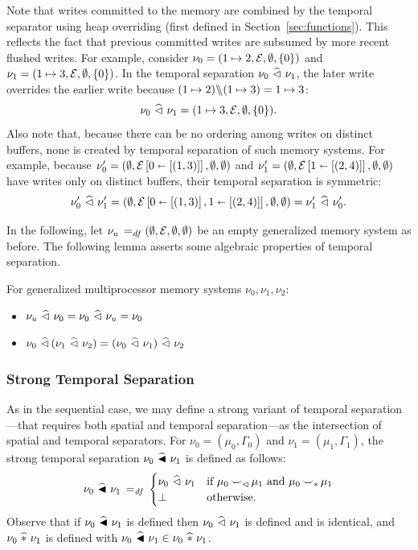 \documentclass[11pt]{report}         %
\begin{document}
Note that writes committed to the memory are combined by the temporal separator using heap overriding (first defined in Section~\ref{sec:functions}). This reflects the fact that previous committed writes are subsumed by more recent flushed writes. For example, consider $\nu_0 = (1 \mapsto 2,\arnil,\nil,\set{0})$ and $\nu_1 = (1 \mapsto 3, \arnil, \nil, \set{0})$. In the temporal separation $\nu_0 \mseq \nu_1$, the later write overrides the earlier write because $(1 \mapsto 2) \override (1\mapsto 3) = 1 \mapsto 3$: \[ \nu_0 \mseq \nu_1 = (1 \mapsto 3, \arnil, \nil, \set{0}).\] Also note that, because there can be no ordering among writes on distinct buffers, none is created by temporal separation of such memory systems. For example, because $\nu'_0 = (\nil,\funup{\arnil}{\ptup{0}{\llit{(1,3)}}},\nil,\nil)$ and $\nu'_1 = (\nil,\funup{\arnil}{\ptup{1}{\llit{(2,4)}}},\nil,\nil)$ have writes only on distinct buffers, their temporal separation is symmetric: \[ \nu'_0 \mseq \nu'_1 = (\nil,\funup{\arnil}{\ptup{0}{\llit{(1,3)}},\ptup{1}{\llit{(2,4)}}},\nil,\nil) = \nu'_1 \mseq \nu'_0.\]

In the following, let $\nu_u \eqdef (\nil, \arnil, \nil, \nil)$ be an empty generalized memory system as before. The following lemma asserts some algebraic properties of temporal separation. \begin{proposition}
  \label{lem:temporal-separation-algebra}
  For generalized multiprocessor memory systems $\nu_0, \nu_1, \nu_2$: 
  \begin{itemize}
    \item $\nu_u \mseq \nu_0 = \nu_0 \mseq \nu_u = \nu_0$
    \item $\nu_0 \mseq (\nu_1 \mseq \nu_2) = (\nu_0 \mseq \nu_1) \mseq \nu_2$
  \end{itemize}
\end{proposition}

\subsubsection{Strong Temporal Separation}
\label{sec:strong-temporal-separation}

As in the sequential case, we may define a strong variant of temporal separation---that requires both spatial and temporal separation---as the intersection of spatial and temporal separators. For $\nu_0 = (\mu_0,\Gamma_0)$ and $\nu_1 = (\mu_1,\Gamma_1)$, the strong temporal separation $\nu_0 \msseq \nu_1$ is defined as follows: \[ \nu_0 \msseq \nu_1 \eqdef \begin{cases}
  \nu_0 \mseq \nu_1 & \text{if $\mu_0 \compat_\seqsym \mu_1$ and $\mu_0 \compat_\sepsym \mu_1$} \\ 
  \bot & \text{otherwise.}
\end{cases}\] Observe that if $\nu_0 \msseq \nu_1$ is defined then $\nu_0 \mseq \nu_1$ is defined and is identical, and $\nu_0 \msep \nu_1$ is defined with $\nu_0 \msseq \nu_1 \in \nu_0 \msep \nu_1$.
\end{document}
